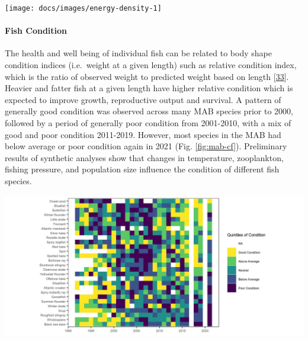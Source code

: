 \documentclass[
  10pt,
]{article}
\let\origfigure\figure
\let\endorigfigure\endfigure
\renewenvironment{figure}[1][2] {
    \expandafter\origfigure\expandafter[H]
} {
    \endorigfigure
}
\begin{document}
\begin{figure}

{\centering \texttt{[image: docs/images/energy-density-1]} 

}

\caption{Forage fish mean energy density mean and standard deviation by season and year, compared with 1980s (Steimle and Terranove 1985) and 1990s (Lawson et al. 1998) values.}\label{fig:energy-density}
\end{figure}

\hypertarget{fish-condition}{%
\paragraph{Fish Condition}\label{fish-condition}}

The health and well being of individual fish can be related to body
shape condition indices (i.e.~weight at a given length) such as relative
condition index, which is the ratio of observed weight to predicted
weight based on length
{[}\protect\hyperlink{ref-le_cren_length-weight_1951}{33}{]}. Heavier
and fatter fish at a given length have higher relative condition which
is expected to improve growth, reproductive output and survival. A
pattern of generally good condition was observed across many MAB species
prior to 2000, followed by a period of generally poor condition from
2001-2010, with a mix of good and poor condition 2011-2019. However,
most species in the MAB had below average or poor condition again in
2021 (Fig. \ref{fig:mab-cf}). Preliminary results of synthetic analyses
show that changes in temperature, zooplankton, fishing pressure, and
population size influence the condition of different fish species.

\begin{figure}

{\centering \includegraphics[width=1\linewidth]{images/MAB_Condition_allsex_2022_viridis} 

}

\caption{Condition factor for fish species in the MAB based on fall NEFSC bottom trawl survey data. MAB data are missing for 2017 due to survey delays, and no survey was conducted in 2020.}\label{fig:mab-cf}
\end{figure}
\end{document}
